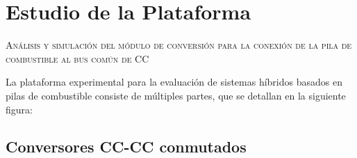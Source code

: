 \section{Estudio de la Plataforma}

\vspace{0.5cm}

\Large\scshape
Análisis y simulación del módulo de conversión para la conexión de la pila de combustible al bus común de CC
\normalfont

\divider

La plataforma experimental para la evaluación de sistemas híbridos basados en pilas de combustible consiste de múltiples partes, que se detallan en la siguiente figura:



\subsection{Conversores CC-CC conmutados}

